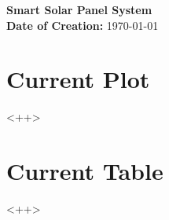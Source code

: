 \documentclass[final, hidelinks, 12pt, a4paper]{article}
\begin{document}
    \begin{titlepage}
        \begin{center}
        	\vspace{1cm}
            {\LARGE{\bfseries Smart Solar Panel System}}\\

            \vspace{15cm}
            {\bfseries Date of Creation:} \today\\
    	\end{center}
    \end{titlepage}

    \tableofcontents
    \clearpage

    \listoftables
    \clearpage
    
    \listoffigures
    \clearpage



    \pagestyle{fancy}
    \cfoot{}



    \section{Current Plot}
    \label{sct:cplot}
    <++>
    \clearpage
    \section{Current Table}
    \label{sct:ctable}
    <++>
    \clearpage

    \printglossaries
    \glsaddallunused
    \clearpage
   

    \printbibliography
    \clearpage


    \noappendicestocpagenum
    \addappheadtotoc

\end{document}
